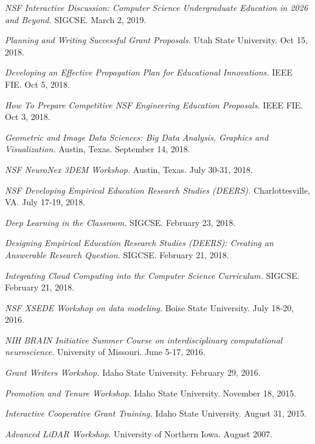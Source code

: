 \documentclass[margin,line]{res}
\begin{document}
\begin{resume}
\textit{NSF Interactive Discussion: Computer Science Undergraduate Education in 2026 and Beyond.} SIGCSE. March 2, 2019.

\textit{Planning and Writing Successful Grant Proposals.} Utah State University. Oct 15, 2018.

\textit{Developing an Effective Propagation Plan for Educational Innovations.} IEEE FIE. Oct 5, 2018.

\textit{How To Prepare Competitive NSF Engineering Education Proposals.} IEEE FIE. Oct 3, 2018.

\textit{Geometric and Image Data Sciences: Big Data Analysis, Graphics and Visualization.} Austin, Texas. September 14, 2018.

\textit{NSF NeuroNex 3DEM Workshop.} Austin, Texas. July 30-31, 2018.

\textit{NSF Developing Empirical Education Research Studies (DEERS).} Charlottesville, VA. July 17-19, 2018.

\textit{Deep Learning in the Classroom.} SIGCSE. February 23, 2018.

\textit{Designing Empirical Education Research Studies (DEERS): Creating an Answerable Research Question.} SIGCSE. February 21, 2018.

\textit{Integrating Cloud Computing into the Computer Science Curriculum.} SIGCSE. February 21, 2018.

\textit{NSF XSEDE Workshop on data modeling.} Boise State University. July 18-20, 2016.

\textit{NIH BRAIN Initiative Summer Course on interdisciplinary computational neuroscience.} University of Missouri. June 5-17, 2016.

\textit{Grant Writers Workshop.} Idaho State University. February 29, 2016.

\textit{Promotion and Tenure Workshop.} Idaho State University. November 18, 2015.

\textit{Interactive Cooperative Grant Training.} Idaho State University. August 31, 2015.

\textit{Advanced LiDAR Workshop}. University of Northern Iowa. August 2007.


\end{resume}
\end{document}
